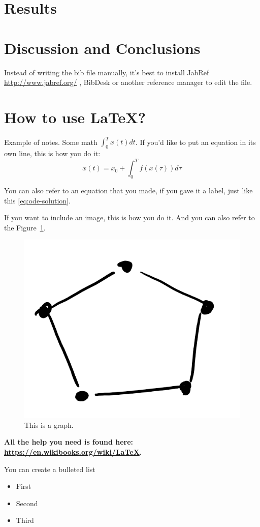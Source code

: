 \documentclass{amsart}
\begin{document}
\section{Results}

\section{Discussion and Conclusions}


Instead of writing the bib file manually, it's best to install JabRef \url{http://www.jabref.org/} , BibDesk or another reference manager to edit the file.

\clearpage \appendix

\section{How to use LaTeX?}

Example of notes. Some math $\int_0^Tx(t)dt$. If you'd like to put an equation in its own line, this is how you do it:
\begin{equation}
x(t) = x_0 + \int_0^T f(x(\tau))d\tau  \label{eq:ode-solution}
\end{equation}


You can also refer to an equation that you made, if you gave it a label, just like this \eqref{eq:ode-solution}.

If you want to include an image, this is how you do it. And you can also refer to the Figure~\ref{fig:graph}.
\begin{figure}
  \centering
  \includegraphics[width=0.2\linewidth]{figs/graph.png}
  \caption{This is a graph.}\label{fig:graph}
\end{figure}

\textbf{  All the help you need is found here: \url{https://en.wikibooks.org/wiki/LaTeX}. }


You can create a bulleted list
\begin{itemize}
\item First
\item Second
\item Third
\end{itemize}
\end{document}
